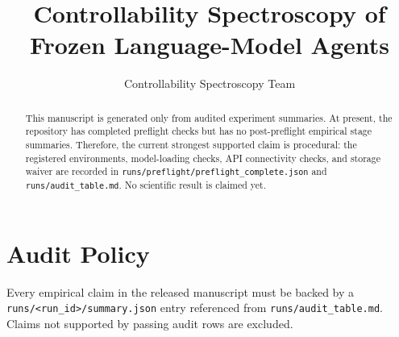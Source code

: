\documentclass{article}
\title{Controllability Spectroscopy of Frozen Language-Model Agents}
\author{Controllability Spectroscopy Team}
\date{}
\begin{document}
\maketitle

\begin{abstract}
This manuscript is generated only from audited experiment summaries. At present, the repository has completed preflight checks but has no post-preflight empirical stage summaries. Therefore, the current strongest supported claim is procedural: the registered environments, model-loading checks, API connectivity checks, and storage waiver are recorded in \texttt{runs/preflight/preflight\_complete.json} and \texttt{runs/audit\_table.md}. No scientific result is claimed yet.
\end{abstract}

\section{Audit Policy}
Every empirical claim in the released manuscript must be backed by a \texttt{runs/<run\_id>/summary.json} entry referenced from \texttt{runs/audit\_table.md}. Claims not supported by passing audit rows are excluded.



\end{document}
